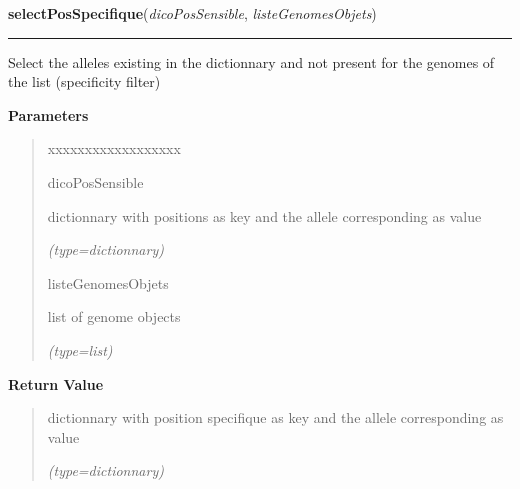 \hspace{.8\funcindent}\begin{boxedminipage}{\funcwidth}

    \raggedright \textbf{selectPosSpecifique}(\textit{dicoPosSensible}, \textit{listeGenomesObjets})

    \vspace{-1.5ex}

    \rule{\textwidth}{0.5\fboxrule}
\setlength{\parskip}{2ex}
    Select the alleles existing in the dictionnary and not present for the 
    genomes of the list (specificity filter)

\setlength{\parskip}{1ex}
      \textbf{Parameters}
      \vspace{-1ex}

      \begin{quote}
        \begin{Ventry}{xxxxxxxxxxxxxxxxxx}

          \item[dicoPosSensible]

          dictionnary with positions as key and the allele corresponding as
          value

            {\it (type=dictionnary)}

          \item[listeGenomesObjets]

          list of genome objects

            {\it (type=list)}

        \end{Ventry}

      \end{quote}

      \textbf{Return Value}
    \vspace{-1ex}

      \begin{quote}
      dictionnary with position specifique as key and the allele 
      corresponding as value

      {\it (type=dictionnary)}

      \end{quote}

    \end{boxedminipage}

    \label{script-phyloFixedVar:allOtherGenomes}

    \vspace{0.5ex}

